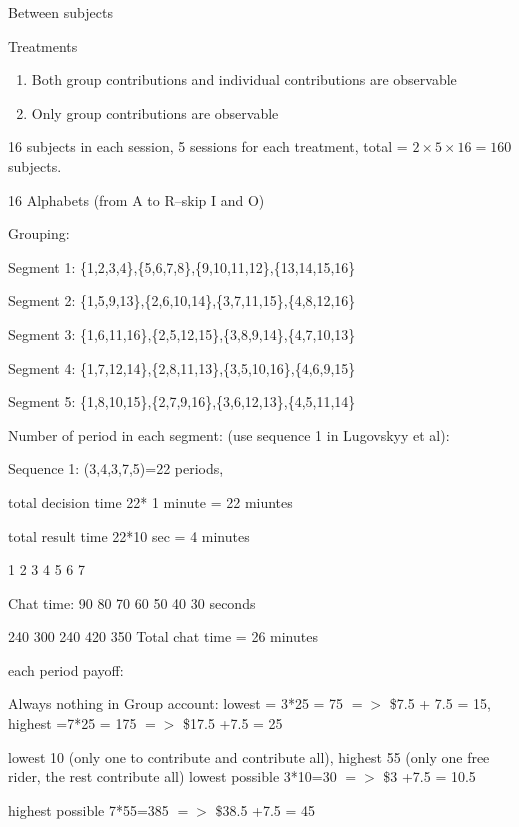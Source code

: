\documentclass[11pt]{article}
\begin{document}
Between subjects

Treatments
\begin{enumerate}
\item Both group contributions and individual contributions are observable
\item Only group contributions are observable
\end{enumerate}

16 subjects in each session, 5 sessions for each treatment, total = $2 \times 5 \times 16 = 160 $ subjects.
 
16 Alphabets (from A to R--skip I and O)

Grouping:

Segment 1: \{1,2,3,4\},\{5,6,7,8\},\{9,10,11,12\},\{13,14,15,16\}

Segment 2: \{1,5,9,13\},\{2,6,10,14\},\{3,7,11,15\},\{4,8,12,16\}

Segment 3: \{1,6,11,16\},\{2,5,12,15\},\{3,8,9,14\},\{4,7,10,13\}

Segment 4: \{1,7,12,14\},\{2,8,11,13\},\{3,5,10,16\},\{4,6,9,15\}

Segment 5: \{1,8,10,15\},\{2,7,9,16\},\{3,6,12,13\},\{4,5,11,14\}


Number of period in each segment: (use sequence 1 in Lugovskyy et al):  

Sequence 1: (3,4,3,7,5)=22 periods, 

total decision time 22* 1 minute = 22 miuntes

total result time 22*10 sec = 4 minutes


1  2  3  4  5  6  7 

Chat time: 90 80 70 60 50 40 30 seconds

240
300
240
420
350
Total chat time = 26 minutes

each period payoff: 


Always nothing in Group account: lowest = 3*25 = 75 $=>$ \$7.5 + 7.5 = 15, highest =7*25 = 175 $=>$ \$17.5 +7.5 = 25

lowest 10 (only one to contribute and contribute all), highest 55 (only one free rider, the rest contribute all)
lowest possible 3*10=30 $=>$ \$3 +7.5 = 10.5

highest possible 7*55=385 $=>$ \$38.5 +7.5 = 45






\newpage
\end{document}
